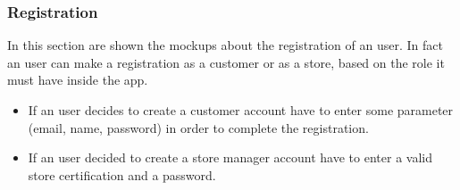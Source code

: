 \documentclass{article}
\begin{document}
		\newpage
		
		\subsubsection{Registration}
		In this section are shown the mockups about the registration of an user. In fact an user can make a registration as a customer or as a store, based on the role it must have inside the app.
		\begin{itemize}
			\item If an user decides to create a customer account have to enter some parameter (email, name, password) in order to complete the registration.
			\item If an user decided to create a store manager account have to enter a valid store certification and a password.
		\end{itemize}
		\bigskip
		\bigskip
\end{document}
